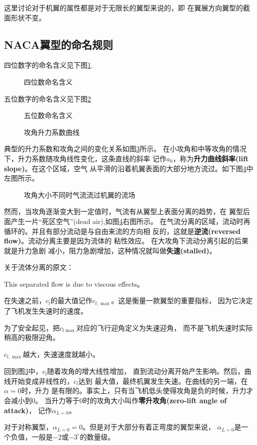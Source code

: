 这里讨论对于机翼的属性都是对于无限长的翼型来说的，即
在翼展方向翼型的截面形状不变。
\subsection{NACA翼型的命名规则}
四位数字的命名含义见下图\ref{fig:four_digtal}.
\begin{figure}[!ht]
    \centering
    
    \caption{四位数命名含义}
    \label{fig:four_digtal}
\end{figure}
五位数字的命名含义见下图\ref{fig:five_digtal}
\begin{figure}[!ht]
    \centering
    
    \caption{五位数命名含义}
    \label{fig:five_digtal}
\end{figure}
\begin{figure}[!ht]
	\centering
	
	\caption{攻角升力系数曲线}
	\label{fig:angle_of_attack}
\end{figure}

典型的升力系数和攻角之间的变化关系如图\ref{fig:angle_of_attack}所示。
在小攻角和中等攻角的情况下，升力系数随攻角线性变化，这条直线的斜率
记作$a_0$，称为{\bfseries 升力曲线斜率(lift slope)}。在这个区域，空气
从平滑的沿着机翼表面的大部分地方流过。如下图\ref{fig:separate}中左图所示。
\begin{figure}[!ht]
	\centering
	
	\caption{攻角大小不同时气流流过机翼的流场}
	\label{fig:separate}
\end{figure}
然而，当攻角逐渐变大到一定值时，气流有从翼型上表面分离的趋势，在
翼型后面产生一片“死区空气”(dead air),如图\ref{fig:separate}右图所示。
在气流分离的区域，流动时再循环的。并且有部分流动是与自由来流的方向相
反的，这就是{\bfseries 逆流(reversed flow)}。流动分离主要是因为流体的
粘性效应。
在大攻角下流动分离引起的后果就是{\color{noteorange}升力急剧
减小，阻力急剧增加}，这种情况就叫做{\bfseries 失速(stalled)}。

\begin{notice}
	关于流体分离的原文：

	This separated flow is due to
	viscous effects。
\end{notice}
在失速之前，$c_l$的最大值记作$c_{l,\max}$。这是衡量一款翼型的重要指标，
因为它决定了飞机发生失速时的速度。

为了安全起见，把$c_{l \max}$对应的飞行迎角定义为失速迎角，
而不是飞机失速时实际稍高的极限迎角。
\begin{notice}
	$c_{l,\max}$越大，失速速度就越小。
\end{notice}
回到图\ref{fig:angle_of_attack}中，$c_l$随着攻角的增大线性增加，
直到流动分离开始产生影响。然后，曲线开始变成非线性的，$c_l$达到
最大值，最终机翼发生失速。在曲线的另一端，在$\alpha=0$时，升力
是有限的。事实上，只有当飞机低头使得攻角是负的时候，升力才会减小到0。
当升力等于0时的攻角大小叫作{\bfseries 零升攻角(zero-lift angle of attack)}，
记作$\alpha_{L=0}$。
\begin{notice}
	对于对称翼型，$\alpha_{L=0}=0$。但是对于大部分有着正弯度的翼型来说，
	$\alpha_{L=0}$是一个负值，一般是$-2$或$-3^{\circ}$的数量级。
\end{notice}

